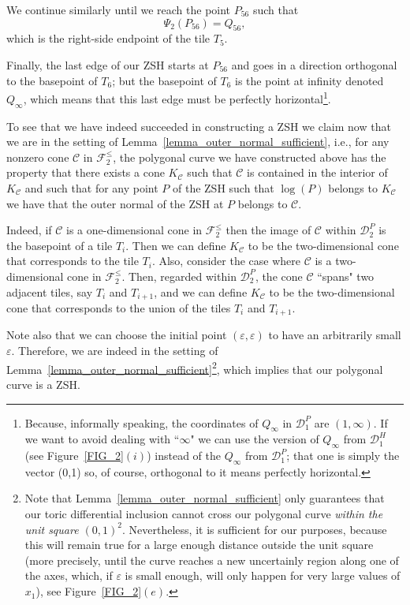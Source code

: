 \documentclass[12pt,letterpaper]{article}
\newcommand{\C}{\mathcal{C}}
\newcommand{\D}{\mathcal{D}}
\newcommand{\F}{\mathcal{F}}
\newcommand{\eps}{\varepsilon}
\begin{document}
We continue similarly until we reach the point $P_{56}$ such that 
$$
\Psi_2(P_{56}) = Q_{56},
$$
which is the right-side endpoint of the tile $T_5$. 

Finally, the last edge of our ZSH starts at $P_{56}$ and goes in a direction orthogonal to the basepoint of $T_6$; but the basepoint of $T_6$ is the point at infinity denoted $Q_\infty$, which means that this last edge must be perfectly horizontal\footnote{Because, informally speaking, the coordinates of $Q_\infty$ in $\D_1^P$ are $(1, \infty)$. If we want to avoid dealing with ``$\infty$" we can use the version of $Q_\infty$ from $\D_1^H$ (see Figure~\ref{FIG_2}$(i)$) instead of the $Q_\infty$ from $\D_1^P$; that one is simply the vector (0,1) so, of course, orthogonal to it means perfectly horizontal.}. 

To see that we have indeed succeeded in constructing a ZSH we claim now that we are in the setting of Lemma~\ref{lemma_outer_normal_sufficient}, i.e.,  for any nonzero cone $\C$ in $\F_2^\le$, the polygonal curve we have constructed above has the property that there exists a  cone $K_\C$ such that $\C$ is contained in the interior of $K_\C$ and such that for any point $P$ of the ZSH such that $\log(P)$ belongs to $K_\C$ we have that the outer normal of the ZSH at $P$ belongs to $\C$.
 
Indeed, if $\C$ is a one-dimensional cone in $\F_2^\le$ then the image of  $\C$ within $\D_2^P$ is the basepoint of a tile $T_i$. Then we can define $K_\C$ to be the two-dimensional cone that corresponds to the tile $T_i$. Also, consider the case where $\C$ is a two-dimensional cone in $\F_2^\le$. Then, regarded within $\D_2^P$, the cone   $\C$ ``spans" two adjacent tiles, say $T_i$ and $T_{i+1}$, and we can  define $K_\C$ to be the two-dimensional cone that corresponds to the union of the tiles $T_i$ and $T_{i+1}$. 

Note also that we can choose the initial point  $(\eps,\eps)$ to have an arbitrarily small $\eps$.
Therefore, we are indeed in the setting of Lemma~\ref{lemma_outer_normal_sufficient}\footnote{Note that Lemma~\ref{lemma_outer_normal_sufficient} only guarantees  that our toric differential inclusion cannot cross our polygonal curve  {\em within the unit square $(0,1)^2$}. Nevertheless, it is sufficient for our purposes, because this will remain true for a large enough distance outside the unit square (more precisely, until the curve reaches a new uncertainly region along one of the axes, which, if $\eps$ is small enough, will only happen for very large values of $x_1$), see Figure~\ref{FIG_2}$(e)$.}, which implies that our polygonal curve is a ZSH.   
\end{document}
